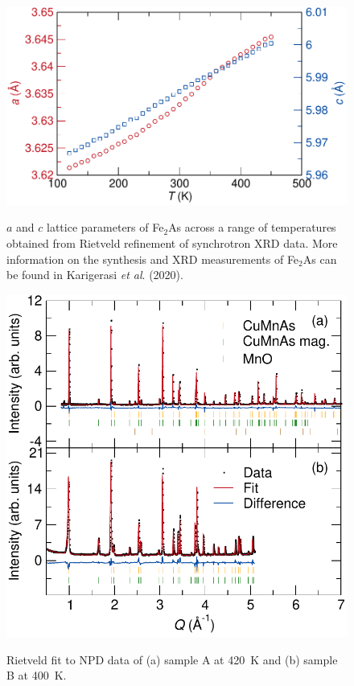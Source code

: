 \documentclass[10pt,doublespacing,edeposit]{uiucthesis2020}
\begin{document}
\begin{mainmatter}
\begin{figure}[h]
\centering\includegraphics[width=0.7\columnwidth]{figures/ch7/Fe2As_lattice_constants_cropped.pdf} \\
\caption{\label{fig:Fe2As}
$a$ and $c$ lattice parameters of Fe$_2$As across a range of temperatures obtained from Rietveld refinement of synchrotron XRD data. More information on the synthesis and XRD measurements of Fe$_2$As can be found in Karigerasi \emph{et al}. (2020).
} 
\end{figure}

\begin{figure}[h]
\centering\includegraphics[width=0.7\columnwidth]{figures/ch7/suppl_rietveld_fit_samples_400K_cropped.pdf} \\
\caption{\label{fig:400K_rietveld_fit}
Rietveld fit to NPD data of (a) sample A at 420~K and (b) sample B at 400~K. 
} 
\end{figure}


\end{mainmatter}
\end{document}
